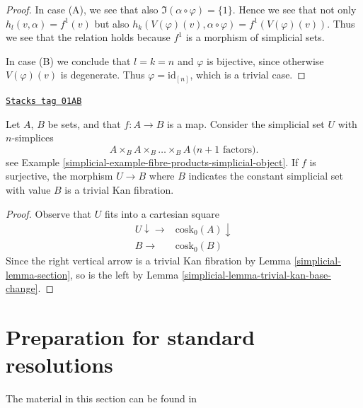 \begin{proof}
\medskip\noindent
In case (A), we see that also $\Im(\alpha \circ \varphi) = \{1\}$.
Hence we see that not only $h_l(v, \alpha) = f^1(v)$ but also
$h_k(V(\varphi)(v), \alpha \circ \varphi) = f^1(V(\varphi)(v))$.
Thus we see that the relation holds because $f^1$ is a morphism
of simplicial sets.

\medskip\noindent
In case (B) we conclude that $l = k = n$ and
$\varphi$ is bijective, since otherwise $V(\varphi)(v)$
is degenerate. Thus $\varphi = \text{id}_{[n]}$, which is a trivial case.
\end{proof}

\begin{lemma}
\label{simplicial-lemma-cosk-minus-one-equivalence}
\href{https://stacks.math.columbia.edu/tag/01AB}{\texttt{Stacks tag 01AB}}

Let $A$, $B$ be sets, and that $f : A \to B$ is a map. Consider the simplicial
set $U$ with $n$-simplices
$$
A \times_B A \times_B \ldots \times_B A\ (n + 1 \text{ factors)}.
$$
see Example \ref{simplicial-example-fibre-products-simplicial-object}.
If $f$ is surjective, the morphism $U \to B$
where $B$ indicates the constant simplicial set with value $B$
is a trivial Kan fibration.
\end{lemma}

\begin{proof}

Observe that $U$ fits into a cartesian square
$$
\begin{array}{cc}U \downarrow\longrightarrow & \text{cosk}_0(A) \downarrow \\ B \longrightarrow & \text{cosk}_0(B)\end{array}
$$
Since the right vertical arrow is a trivial Kan fibration by
Lemma \ref{simplicial-lemma-section}, so is the left by
Lemma \ref{simplicial-lemma-trivial-kan-base-change}.
\end{proof}

\section{Preparation for standard resolutions}
\label{simplicial-section-standard-pre}
The material in this section can be found in \cite[Appendix 1]{Godement}

